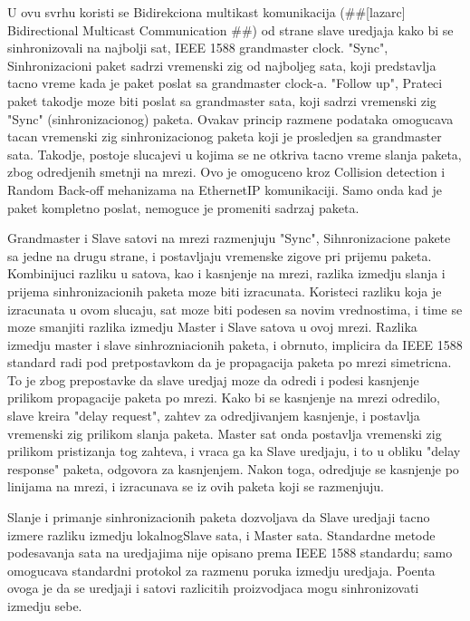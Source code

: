 \documentclass[a4paper,12pt, master]{etf}
\begin{document}
	U ovu svrhu koristi se Bidirekciona multikast komunikacija (\#\#[lazarc] Bidirectional 
	Multicast Communication \#\#) od strane slave uredjaja kako bi se sinhronizovali na 
	najbolji sat, IEEE 1588 grandmaster clock. "Sync", Sinhronizacioni paket sadrzi vremenski 
	zig od najboljeg sata, koji predstavlja tacno vreme kada je paket poslat sa grandmaster 
	clock-a. "Follow up", Prateci paket takodje moze biti poslat sa grandmaster sata, koji 
	sadrzi vremenski zig "Sync" (sinhronizacionog) paketa. Ovakav princip razmene podataka 
	omogucava tacan vremenski zig sinhronizacionog paketa koji je prosledjen sa grandmaster 
	sata. Takodje, postoje slucajevi u kojima se ne otkriva tacno vreme slanja paketa, zbog 
	odredjenih smetnji na mrezi. Ovo je omoguceno kroz Collision detection i Random Back-off 
	mehanizama na Ethernet\/IP komunikaciji. Samo onda kad je paket kompletno poslat, nemoguce 
	je promeniti sadrzaj paketa. 
	
	Grandmaster i Slave satovi na mrezi razmenjuju "Sync", Sihnronizacione pakete sa jedne na 
	drugu strane, i postavljaju vremenske zigove pri prijemu paketa. Kombinijuci razliku u 
	satova, kao i kasnjenje na mrezi, razlika izmedju slanja i prijema sinhronizacionih 
	paketa moze biti izracunata. Koristeci razliku koja je izracunata u ovom slucaju, sat 
	moze biti podesen sa novim vrednostima, i time se moze smanjiti razlika izmedju Master i 
	Slave satova u ovoj mrezi. Razlika izmedju master i slave sinhrozniacionih paketa, i 
	obrnuto, implicira da IEEE 1588 standard radi pod pretpostavkom da je propagacija paketa 
	po mrezi simetricna. To je zbog prepostavke da slave uredjaj moze da odredi i podesi 
	kasnjenje prilikom propagacije paketa po mrezi. Kako bi se kasnjenje na mrezi odredilo, 
	slave kreira "delay request", zahtev za odredjivanjem kasnjenje, i postavlja vremenski 
	zig prilikom slanja paketa. Master sat onda postavlja vremenski zig prilikom pristizanja 
	tog zahteva, i vraca ga ka Slave uredjaju, i to u obliku "delay response" paketa, 
	odgovora za kasnjenjem. Nakon toga, odredjuje se kasnjenje po linijama na mrezi, i 
	izracunava se iz ovih paketa koji se razmenjuju.
	
	Slanje i primanje sinhronizacionih paketa dozvoljava da Slave uredjaji tacno izmere 
	razliku izmedju lokalnog\/Slave sata, i Master sata. Standardne metode podesavanja sata na 
	uredjajima nije opisano prema IEEE 1588 standardu; samo omogucava standardni protokol za 
	razmenu poruka izmedju uredjaja. Poenta ovoga je da se uredjaji i satovi razlicitih 
	proizvodjaca mogu sinhronizovati izmedju sebe.
	
\end{document}
